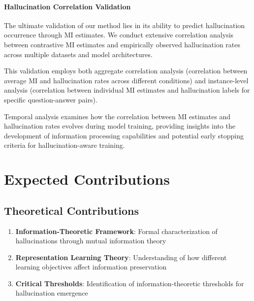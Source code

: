 \paragraph{Hallucination Correlation Validation}
The ultimate validation of our method lies in its ability to predict hallucination occurrence through MI estimates. We conduct extensive correlation analysis between contrastive MI estimates and empirically observed hallucination rates across multiple datasets and model architectures.

This validation employs both aggregate correlation analysis (correlation between average MI and hallucination rates across different conditions) and instance-level analysis (correlation between individual MI estimates and hallucination labels for specific question-answer pairs).

Temporal analysis examines how the correlation between MI estimates and hallucination rates evolves during model training, providing insights into the development of information processing capabilities and potential early stopping criteria for hallucination-aware training.

\section{Expected Contributions}
\label{sec:contributions}

\subsection{Theoretical Contributions}
\begin{enumerate}
    \item \textbf{Information-Theoretic Framework}: Formal characterization of hallucinations through mutual information theory
    \item \textbf{Representation Learning Theory}: Understanding of how different learning objectives affect information preservation
    \item \textbf{Critical Thresholds}: Identification of information-theoretic thresholds for hallucination emergence
\end{enumerate}

